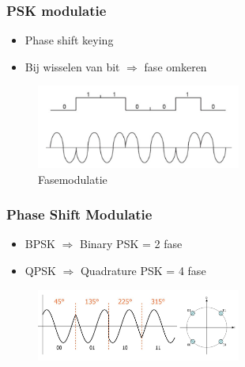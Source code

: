 \documentclass{article}
\begin{document}
\subsubsection{PSK modulatie}
\begin{itemize}
    \item Phase shift keying
    \item Bij wisselen van bit $\Rightarrow$ fase omkeren
\end{itemize}

\begin{figure}[H]
    \centering
    \includegraphics[width=0.6\textwidth]{Screenshot_20200302_122031.png}
    \caption{Fasemodulatie}
\end{figure}

\subsubsection{Phase Shift Modulatie}
\begin{itemize}
    \item BPSK $\Rightarrow$ Binary PSK = 2 fase
    \item QPSK $\Rightarrow$ Quadrature PSK = 4 fase
\end{itemize}

\begin{figure}[H]
    \centering
    \includegraphics[width=0.6\textwidth]{Screenshot_20200302_122452.png}
    \caption{}
\end{figure}
\end{document}
